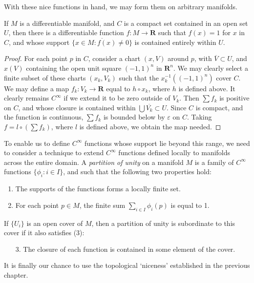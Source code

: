 With these nice functions in hand, we may form them on arbitrary manifolds.

\begin{theorem}
    If $M$ is a differentiable manifold, and $C$ is a compact set contained in an open set $U$, then there is a differentiable function $f:M \to \mathbf{R}$ such that $f(x) = 1$ for $x$ in $C$, and whose support $\overline{\{ x \in M : f(x) \neq 0 \}}$ is contained entirely within $U$.
\end{theorem}
\begin{proof}
    For each point $p$ in $C$, consider a chart $(x,V)$ around $p$, with $\overline{V} \subset U$, and $x(V)$ containing the open unit square $(-1,1)^n$ in $\mathbf{R}^n$. We may clearly select a finite subset of these charts $(x_k,V_k)$ such that the $x_k^{-1}((-1,1)^n)$ cover $C$. We may define a map $f_k:V_k \to \mathbf{R}$ equal to $h \circ x_k$, where $h$ is defined above. It clearly remains $C^\infty$ if we extend it to be zero outside of $V_k$. Then $\sum f_k$ is positive on $C$, and whose closure is contained within $\bigcup \overline{V_k} \subset U$. Since $C$ is compact, and the function is continuous, $\sum f_k$ is bounded below by $\varepsilon$ on $C$. Taking $f = l \circ (\sum f_k)$, where $l$ is defined above, we obtain the map needed.
\end{proof}

To enable us to define $C^\infty$ functions whose support lie beyond this range, we need to consider a technique to extend $C^\infty$ functions defined locally to manifolds across the entire domain. A \emph{partition of unity} on a manifold $M$ is a family of $C^\infty$ functions $\{ \phi_i : i \in I \}$, and such that the following two properties hold:
%
\begin{enumerate}
    \item The supports of the functions forms a locally finite set.
    \item For each point $p \in M$, the finite sum $\sum_{i \in I} \phi_i(p)$ is equal to 1.
\end{enumerate}
%
If $\{ U_i \}$ is an open cover of $M$, then a partition of unity is subordinate to this cover if it also satisfies (3):
%
\begin{enumerate}
    \item[3.] The closure of each function is contained in some element of the cover.
\end{enumerate}
%
It is finally our chance to use the topological `niceness' established in the previous chapter.

